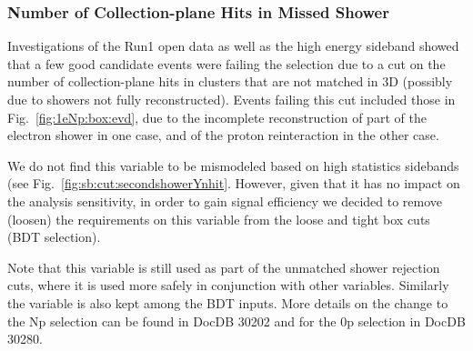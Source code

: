 \subsubsection{Number of Collection-plane Hits in Missed Shower}
\label{sec:sideband:newcuts:nhits}
Investigations of the Run1 open data as well as the \npsel high energy sideband showed that a few good candidate \nuecc events were failing the selection due to a cut on the number of collection-plane hits in clusters that are not matched in 3D (possibly due to showers not fully reconstructed). Events failing this cut included those in Fig.~\ref{fig:1eNp:box:evd}, due to the incomplete reconstruction of part of the electron shower in one case, and of the proton reinteraction in the other case.

We do not find this variable to be mismodeled based on high statistics sidebands (see Fig.~\ref{fig:sb:cut:secondshowerYnhit}. However, given that it has no impact on the analysis sensitivity, in order to gain signal efficiency we decided to remove (loosen) the requirements on this variable from the \npsel loose and tight box cuts (\zpsel BDT selection). 

Note that this variable is still used as part of the unmatched shower rejection cuts, where it is used more safely in conjunction with other variables. Similarly the variable is also kept among the BDT inputs. More details on the change to the Np selection can be found in DocDB 30202 and for the 0p selection in DocDB 30280.


